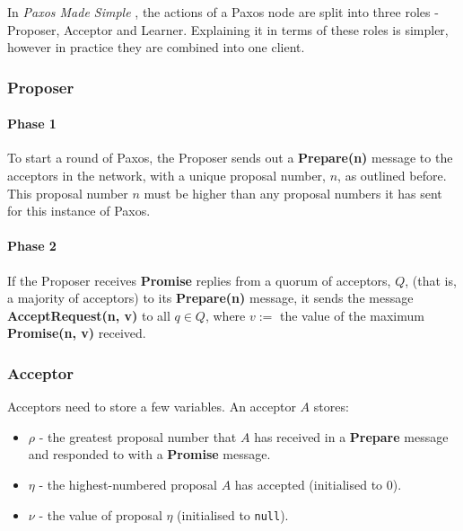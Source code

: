 \documentclass[12pt,twoside,notitlepage]{report}
\newcommand{\msg}[1] {{\bf #1}}         %
\begin{document}
\label{sec:how-paxos-works}
In \emph{Paxos Made Simple} \cite{lamport01}, the actions of a Paxos node are split into three
roles - Proposer, Acceptor and Learner. Explaining it in terms of these roles is simpler, however
in practice they are combined into one client.

\subsubsection*{Proposer}

\paragraph{Phase 1}

To start a round of Paxos, the Proposer sends out a \msg{Prepare(n)} message to the acceptors in
the network, with a unique proposal number, $n$, as outlined before. This proposal number $n$ must
be higher than any proposal numbers it has sent for this instance of Paxos.


\paragraph{Phase 2}

If the Proposer receives \msg{Promise} replies from a quorum of acceptors, $Q$, (that is, a majority of
acceptors) to its \msg{Prepare(n)} message, it sends the message \msg{AcceptRequest(n, v)} to all
$q \in Q$, where
$v := $ the value of the maximum \msg{Promise(n, v)} received.

\subsubsection*{Acceptor}

Acceptors need to store a few variables. An acceptor $A$ stores:
\begin{itemize}
\item $\rho$ - the greatest proposal number that $A$ has received in a \msg{Prepare} message and
	responded to with a \msg{Promise} message.
\item $\eta$ - the highest-numbered proposal $A$ has accepted (initialised to $0$).
\item $\nu$ - the value of proposal $\eta$ (initialised to \verb+null+).
\end{itemize}
\end{document}

